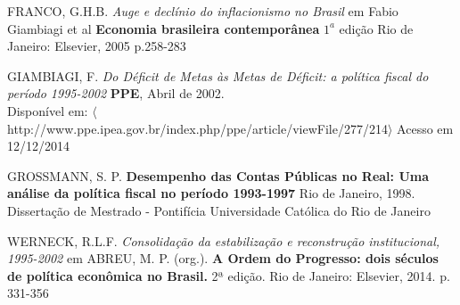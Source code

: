 \documentclass{article}
\begin{document}
\begin{thebibliography}{16}
 

FRANCO, G.H.B.
\emph{Auge e declínio do inflacionismo no Brasil} em Fabio Giambiagi et al
\textbf{Economia brasileira contemporânea}
$1^{a}$ edição
Rio de Janeiro: Elsevier, 
2005 p.258-283 

GIAMBIAGI, F.
\emph{Do Déficit de Metas às Metas de Déficit: a política fiscal do período 1995-2002}
\textbf{PPE}, 
Abril de 2002. \\
Disponível em: $\langle$http://www.ppe.ipea.gov.br/index.php/ppe/article/viewFile/277/214$\rangle$
Acesso em 12/12/2014

GROSSMANN, S. P.
\textbf{Desempenho das Contas Públicas no Real: Uma análise da política fiscal no período 1993-1997}
Rio de Janeiro, 1998. Dissertação de Mestrado - Pontifícia Universidade Católica do Rio de Janeiro

WERNECK, R.L.F. \emph{Consolidação da estabilização e  reconstrução institucional, 1995-2002} em 
ABREU, M. P. (org.). 
\textbf{A Ordem do Progresso: dois séculos de política econômica no Brasil.}
2ª edição.
Rio de Janeiro: Elsevier,
2014. p. 331-356


\end{thebibliography}
\end{document}
